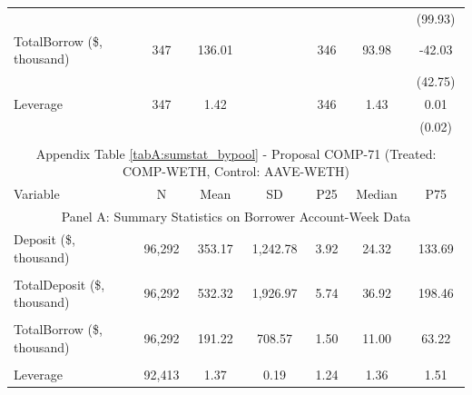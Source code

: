 \begin{table}[ht!]
\begin{tabular*}{\linewidth}{@{\extracolsep{\fill}}lcccccc }
          &       &       &       &       &       & (99.93) \\
    TotalBorrow (\$, thousand) & 347   & 136.01 &       & 346   & 93.98 & -42.03 \\
          &       &       &       &       &       & (42.75) \\
    Leverage & 347   & 1.42  &       & 346   & 1.43  & 0.01 \\
          &       &       &       &       &       & (0.02) \\
    \bottomrule
              &       &       &       &       &       &  \\
      \multicolumn{7}{c}{Appendix Table \ref{tabA:sumstat_bypool} - Proposal COMP-71 (Treated: COMP-WETH, Control: AAVE-WETH)} \\
        \toprule
     Variable  &N & Mean & SD & P25 & Median & P75 \\
     \midrule
    \multicolumn{7}{c}{Panel A: Summary Statistics on Borrower Account-Week Data} \\
    \midrule
    Deposit (\$, thousand) & 96,292 & 353.17 & 1,242.78 & 3.92  & 24.32 & 133.69 \\
          &       &       &       &       &       &  \\
    TotalDeposit (\$, thousand) & 96,292 & 532.32 & 1,926.97 & 5.74  & 36.92 & 198.46 \\
          &       &       &       &       &       &  \\
    TotalBorrow (\$, thousand) & 96,292 & 191.22 & 708.57 & 1.50  & 11.00 & 63.22 \\
          &       &       &       &       &       &  \\
              Leverage & 92,413 & 1.37  & 0.19  & 1.24  & 1.36  & 1.51 \\


\end{tabular*}
\end{table}
